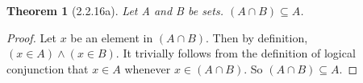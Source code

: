 \documentclass[a4paper, 12pt]{article}
\theoremstyle{plain}
\newtheorem*{theorem*}{Theorem}
\begin{document}
	
	\begin{theorem*}[2.2.16a]
		Let A and B be sets. $(A \cap B) \subseteq A$.
	\end{theorem*}
	
	\begin{proof}
		Let $x$ be an element in $(A \cap B)$. Then by definition, $(x \in A) \land (x \in B)$. 
		It trivially follows from the definition of logical conjunction that $x \in A$ whenever 
		$x \in (A \cap B)$. So $(A \cap B) \subseteq A$. 
	\end{proof}
\end{document}
